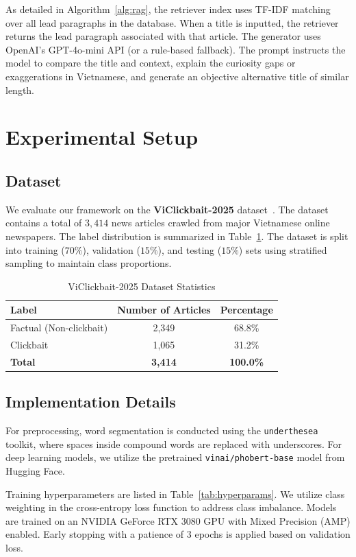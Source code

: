 \documentclass[conference]{IEEEtran}
\begin{document}
As detailed in Algorithm~\ref{alg:rag}, the retriever index uses TF-IDF matching over all lead paragraphs in the database. When a title is inputted, the retriever returns the lead paragraph associated with that article.
The generator uses OpenAI's GPT-4o-mini API (or a rule-based fallback). The prompt instructs the model to compare the title and context, explain the curiosity gaps or exaggerations in Vietnamese, and generate an objective alternative title of similar length.

\section{Experimental Setup}
\subsection{Dataset}
We evaluate our framework on the \textbf{ViClickbait-2025} dataset~\cite{viclickbait2025}. The dataset contains a total of $3,414$ news articles crawled from major Vietnamese online newspapers. The label distribution is summarized in Table~\ref{tab:dataset}.
The dataset is split into training ($70\%$), validation ($15\%$), and testing ($15\%$) sets using stratified sampling to maintain class proportions.

\begin{table}[!ht]
\centering
\caption{ViClickbait-2025 Dataset Statistics}
\label{tab:dataset}
\begin{tabular}{lcc}
\toprule
\textbf{Label} & \textbf{Number of Articles} & \textbf{Percentage} \\
\midrule
Factual (Non-clickbait) & 2,349 & 68.8\% \\
Clickbait & 1,065 & 31.2\% \\
\midrule
\textbf{Total} & \textbf{3,414} & \textbf{100.0\%} \\
\bottomrule
\end{tabular}
\end{table}

\subsection{Implementation Details}
For preprocessing, word segmentation is conducted using the \texttt{underthesea} toolkit, where spaces inside compound words are replaced with underscores. For deep learning models, we utilize the pretrained \texttt{vinai/phobert-base} model from Hugging Face.

Training hyperparameters are listed in Table~\ref{tab:hyperparams}. We utilize class weighting in the cross-entropy loss function to address class imbalance. Models are trained on an NVIDIA GeForce RTX 3080 GPU with Mixed Precision (AMP) enabled. Early stopping with a patience of 3 epochs is applied based on validation loss.
\end{document}
